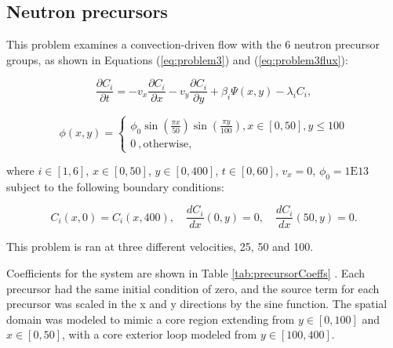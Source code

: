 \subsection{Neutron precursors}
This problem examines a convection-driven flow with the 6 neutron precursor groups, as shown in Equations (\ref{eq:problem3}) and (\ref{eq:problem3flux}): 

\begin{equation}
\frac{\partial C_{i}}{\partial t} = -v_{x}\frac{\partial C_{i}}{\partial x} - v_{y}\frac{\partial C_{i}}{\partial y} + \beta_{i} \Psi (x, y) -\lambda_i C_{i},
\label{eq:problem3}
\end{equation}

\begin{equation}
\phi (x, y) = \begin{cases}
  \phi _0 \sin\left(\frac{\pi x}{50}\right)\sin\left(\frac{\pi y}{100}\right) , x \in [0,50], y \le 100 \\
  0\ , \text{otherwise},
  \label{eq:problem3flux}
\end{cases}
\end{equation}

\noindent where $i \in [1,6]$, $x \in [0, 50]$, $y \in [0, 400]$, $t \in [0, 60]$, $v_{x} = 0$, $\phi_0 = 1\text{E}13$ subject to the following boundary conditions:

\begin{equation}
    C_{i}(x,0) = C_{i}(x,400), \quad \frac{dC_{i}}{dx}(0,y) = 0, \quad \frac{dC_{i}}{dx}(50, y) = 0.
\end{equation}

\noindent This problem is ran at three different velocities, 25, 50 and 100. 

Coefficients for the system are shown in Table \ref{tab:precursorCoeffs} \cite{ott1985}. 
Each precursor had the same initial condition of zero, and the source term for each precursor was scaled in the x and y directions by the sine function. The spatial domain was modeled to mimic a core region extending from $y \in [0,100]$ and $x \in [0,50]$, with a core exterior loop modeled from $y \in [100, 400]$. 

